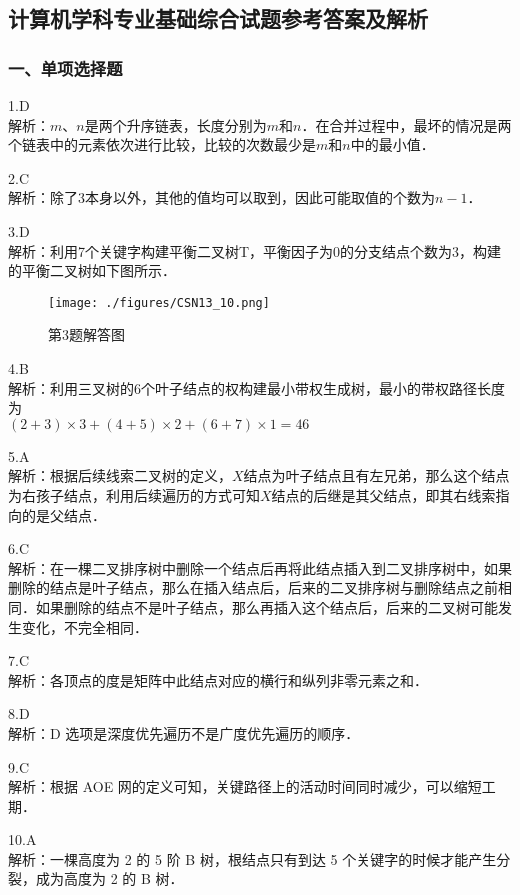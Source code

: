 \subsection{计算机学科专业基础综合试题参考答案及解析}
\subsubsection{一、单项选择题}
1.D \\
解析：$m$、$n$是两个升序链表，长度分别为$m$和$n$．在合并过程中，最坏的情况是两个链表中的元素依次进行比较，比较的次数最少是$m$和$n$中的最小值．

2.C \\
解析：除了$3$本身以外，其他的值均可以取到，因此可能取值的个数为$n-1$． 

3.D \\
解析：利用7个关键字构建平衡二叉树T，平衡因子为0的分支结点个数为3，构建的平衡二叉树如下图所示．
\begin{figure}[ht]
\centering
\texttt{[image: ./figures/CSN13\_10.png]}
\caption{第3题解答图} \label{CSN13_fig10}
\end{figure}

4.B \\
解析：利用三叉树的6个叶子结点的权构建最小带权生成树，最小的带权路径长度为 \\
$(2+3) \times 3 + (4+5) \times 2 + (6+7) \times 1 = 46$

5.A \\
解析：根据后续线索二叉树的定义，$X$结点为叶子结点且有左兄弟，那么这个结点为右孩子结点，利用后续遍历的方式可知$X$结点的后继是其父结点，即其右线索指向的是父结点．

6.C \\
解析：在一棵二叉排序树中删除一个结点后再将此结点插入到二叉排序树中，如果删除的结点是叶子结点，那么在插入结点后，后来的二叉排序树与删除结点之前相同．如果删除的结点不是叶子结点，那么再插入这个结点后，后来的二叉树可能发生变化，不完全相同．

7.C \\
解析：各顶点的度是矩阵中此结点对应的横行和纵列非零元素之和． 

8.D \\
解析：D 选项是深度优先遍历不是广度优先遍历的顺序．

9.C \\
解析：根据 AOE 网的定义可知，关键路径上的活动时间同时减少，可以缩短工期． 

10.A \\
解析：一棵高度为 2 的 5 阶 B 树，根结点只有到达 5 个关键字的时候才能产生分裂，成为高度为 2 的 B 树． 


